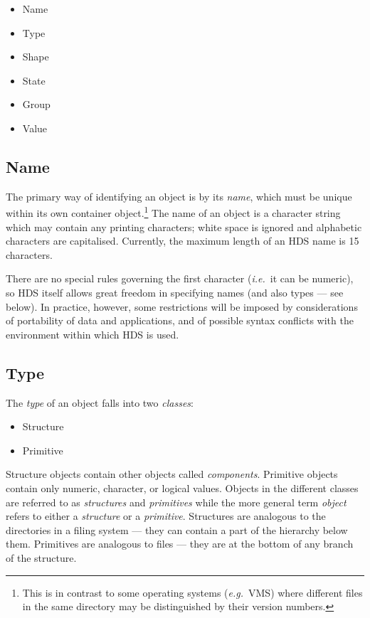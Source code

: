 \begin{itemize}
\item Name
\item Type
\item Shape
\item State
\item Group
\item Value
\end{itemize}

\subsection{Name}

The primary way of identifying an object is by its {\em name}, which must be
unique within its own container object.\footnote{This is in contrast to some
operating systems ({\em e.g.}\ VMS) where different files in the same directory
may be distinguished by their version numbers.} The name of an object is a
character string which may contain any printing characters; white space is
ignored and alphabetic characters are capitalised. Currently, the maximum length
of an HDS name is 15 characters.

There are no special rules governing the first character ({\em i.e.}\ it can be
numeric), so HDS itself allows great freedom in specifying names (and also
types --- see below). In practice, however, some restrictions will be imposed
by considerations of portability of data and applications, and of possible
syntax conflicts with the environment within which HDS is used.

\subsection{Type}

The {\em type} of an object falls into two {\em classes}:

\begin{itemize}
\item Structure
\item Primitive
\end{itemize}

Structure objects contain other objects called {\em components}. Primitive
objects contain only numeric, character, or logical values. Objects in the
different classes are referred to as {\em structures} and {\em primitives}
while the more general term {\em object} refers to either a {\em structure} or
a {\em primitive}. Structures are analogous to the directories in a filing
system --- they can contain a part of the hierarchy below them. Primitives are
analogous to files --- they are at the bottom of any branch of the structure.

